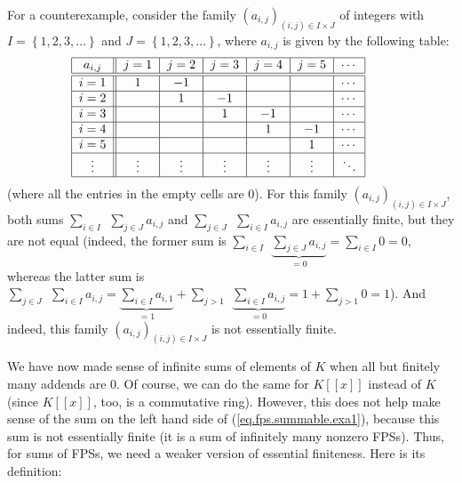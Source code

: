 \begin{fineprint}
For a counterexample, consider the family $\left(  a_{i,j}\right)  _{\left(
i,j\right)  \in I\times J}$ of integers with $I=\left\{  1,2,3,\ldots\right\}
$ and $J=\left\{  1,2,3,\ldots\right\}  $, where $a_{i,j}$ is given by the
following table:%
\[%
\begin{tabular}
[c]{|c||c|c|c|c|c|c|}\hline
$a_{i,j}$ & $j=1$ & $j=2$ & $j=3$ & $j=4$ & $j=5$ & $\cdots$\\\hline\hline
$i=1$ & $1$ & $-1$ &  &  &  & $\cdots$\\\hline
$i=2$ & $\phantom{-1}$ & $1$ & $-1$ &  &  & $\cdots$\\\hline
$i=3$ &  &  & $1$ & $-1$ &  & $\cdots$\\\hline
$i=4$ &  &  &  & $1$ & $-1$ & $\cdots$\\\hline
$i=5$ &  &  &  &  & $1$ & $\cdots$\\\hline
$\vdots$ & $\vdots$ & $\vdots$ & $\vdots$ & $\vdots$ & $\vdots$ & $\ddots
$\\\hline
\end{tabular}
\ \ \ \ \ \
\]
(where all the entries in the empty cells are $0$). For this family $\left(
a_{i,j}\right)  _{\left(  i,j\right)  \in I\times J}$, both sums $\sum_{i\in
I}\ \ \sum_{j\in J}a_{i,j}$ and $\sum_{j\in J}\ \ \sum_{i\in I}a_{i,j}$ are
essentially finite, but they are not equal (indeed, the former sum is
$\sum_{i\in I}\ \ \underbrace{\sum_{j\in J}a_{i,j}}_{=0}=\sum_{i\in I}0=0$,
whereas the latter sum is $\sum_{j\in J}\ \ \sum_{i\in I}a_{i,j}%
=\underbrace{\sum_{i\in I}a_{i,1}}_{=1}+\sum_{j>1}\ \ \underbrace{\sum_{i\in
I}a_{i,j}}_{=0}=1+\sum_{j>1}0=1$). And indeed, this family $\left(
a_{i,j}\right)  _{\left(  i,j\right)  \in I\times J}$ is not essentially finite.
\end{fineprint}

\bigskip

We have now made sense of infinite sums of elements of $K$ when all but
finitely many addends are $0$. Of course, we can do the same for $K\left[
\left[  x\right]  \right]  $ instead of $K$ (since $K\left[  \left[  x\right]
\right]  $, too, is a commutative ring). However, this does not help make
sense of the sum on the left hand side of (\ref{eq.fps.summable.exa1}),
because this sum is not essentially finite (it is a sum of infinitely many
nonzero FPSs). Thus, for sums of FPSs, we need a weaker version of essential
finiteness. Here is its definition:

\Needspace{19pc}

